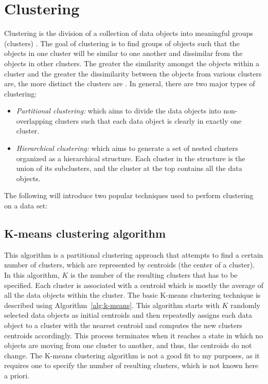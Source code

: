 \section{Clustering}  \label{ch3-clustering}
Clustering is the division of a collection of data objects into meaningful groups (clusters) \cite{jain1999data}. The goal of clustering is to find groups of objects such that the objects in one cluster will be similar to one another and dissimilar from the objects in other clusters. The greater the similarity amongst the objects within a cluster and the greater the dissimilarity between the objects from various clusters are, the more distinct the clusters are \cite{tan2005data}.  In general, there are two major types of clustering:

\begin{itemize} [leftmargin=.4in]
\item \emph{Partitional clustering:} which aims to divide the data objects into non-overlapping clusters such that each data object is clearly in exactly one cluster.
\item \emph{Hierarchical clustering:} which aims to generate a set of nested clusters organized as a hierarchical structure. Each cluster in the structure is the union of its subclusters, and the cluster at the top contains all the data objects.
\end{itemize}

The following will introduce two popular techniques used to perform clustering on a data set:

\subsection{K-means clustering algorithm}
This algorithm is a partitional clustering approach that attempts to find a certain number of clusters, which are represented by centroids (the center of a cluster). In this algorithm, ${K}$ is the number of the resulting clusters that has to be specified. Each cluster is associated with a centroid which is mostly the average of all the
data objects within the cluster. The basic K-means clustering technique is described using Algorithm~\ref{alg:k-means}. This algorithm starts with $K$ randomly selected data objects as initial centroids and then repeatedly assigns each data object to a cluster with the nearest centroid and computes the new clusters centroids accordingly. This process terminates when it reaches a state in which no objects are moving from one cluster to another, and thus, the centroids do not change.
The K-means clustering algorithm is not a good fit to my purposes, as it requires one to specify the number of resulting clusters, which is not known here a priori. %

